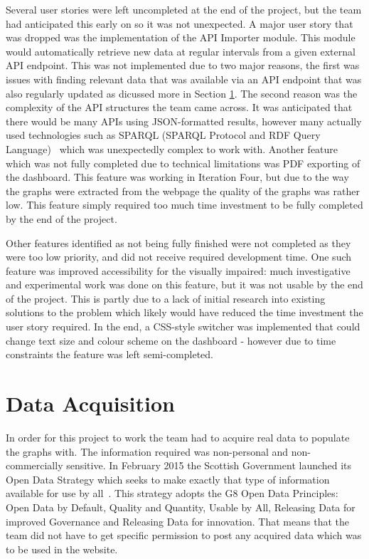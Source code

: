 \documentclass{l3proj}
\begin{document}
Several user stories were left uncompleted at the end of the project, but the team had anticipated this early on so it was not unexpected. A major user story that was dropped was the implementation of the API Importer module. This module would automatically retrieve new data at regular intervals from a given external API endpoint. This was not implemented due to two major reasons, the first was issues with finding relevant data that was available via an API endpoint that was also regularly updated as dicussed more in Section \ref{sec:data-acquisition}. The second reason was the complexity of the API structures the team came across. It was anticipated that there would be many APIs using JSON-formatted results, however many actually used technologies such as SPARQL (SPARQL Protocol and RDF Query Language)~\cite{W3SPARQL} which was unexpectedly complex to work with. Another feature which was not fully completed due to technical limitations was PDF exporting of the dashboard. This feature was working in Iteration Four, but due to the way the graphs were extracted from the webpage the quality of the graphs was rather low. This feature simply required too much time investment to be fully completed by the end of the project.

Other features identified as not being fully finished were not completed as they were too low priority, and did not receive required development time. One such feature was improved accessibility for the visually impaired: much investigative and experimental work was done on this feature, but it was not usable by the end of the project. This is partly due to a lack of initial research into existing solutions to the problem which likely would have reduced the time investment the user story required. In the end, a CSS-style switcher was implemented that could change text size and colour scheme on the dashboard - however due to time constraints the feature was left semi-completed.



\section{Data Acquisition}
\label{sec:data-acquisition}

In order for this project to work the team had to acquire real data to populate the graphs with. The information required was non-personal and non-commercially sensitive. In February 2015 the Scottish Government launched its Open Data Strategy which seeks to make exactly that type of information available for use by all~\cite{ScotGovOpenDataResourcePack}. This strategy adopts the G8 Open Data Principles: Open Data by Default, Quality and Quantity, Usable by All, Releasing Data for improved Governance and Releasing Data for innovation. That means that the team did not have to get specific permission to post any acquired data which was to be used in the website.
\end{document}
